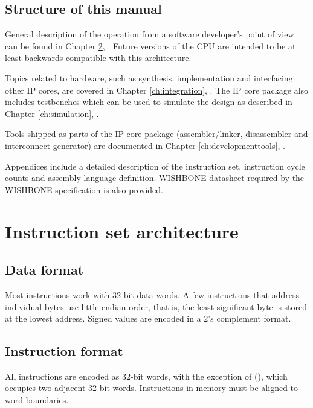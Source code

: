 \documentclass[a4paper,12pt,twoside,extrafontsizes]{memoir}
\begin{document}
\section{Structure of this manual}

General description of the \lxp{} operation from a software developer's point of view can be found in Chapter \ref{ch:isa}, . Future versions of the \lxp{} CPU are intended to be at least backwards compatible with this architecture.

Topics related to hardware, such as synthesis, implementation and interfacing other IP cores, are covered in Chapter \ref{ch:integration}, . The \lxp{} IP core package also includes testbenches which can be used to simulate the design as described in Chapter \ref{ch:simulation}, .

Tools shipped as parts of the \lxp{} IP core package (assembler/linker, disassembler and interconnect generator) are documented in Chapter \ref{ch:developmenttools}, .

Appendices include a detailed description of the \lxp{} instruction set, instruction cycle counts and \lxp{} assembly language definition. WISHBONE datasheet required by the WISHBONE specification is also provided.

\chapter{Instruction set architecture}
\label{ch:isa}

\section{Data format}

Most \lxp{} instructions work with 32-bit data words. A few instructions that address individual bytes use little-endian order, that is, the least significant byte is stored at the lowest address. Signed values are encoded in a 2's complement format.

\section{Instruction format}
\label{sec:instructionformat}

All \lxp{} instructions are encoded as 32-bit words, with the exception of  (), which occupies two adjacent 32-bit words. Instructions in memory must be aligned to word boundaries.
\end{document}
